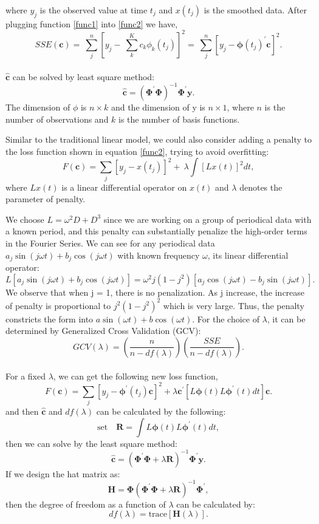 where $y_{j}$ is the observed value at time $t_{j}$ and $x(t_{j})$ is the smoothed data. After plugging function \ref{func1} into \ref{func2} we have,\\
$$SSE\left(\bm{c}\right)=\ \sum_{j}^{n}\left[y_j-\ \sum_{k}^{K}{c_k\phi_k\left(t_j\right)}\right]^2=\ \sum_{j}^{n}\left[y_j-\bm{\phi}\left(t_j\right)^\prime\bm{c}\right]^2.$$\\
$\bm \hat{c}$ can be solved by least square method:\\
$$\hat{\bm{c}}=\left(\bm{\Phi}^\prime\bm{\Phi}\right)^{-1}\bm{\Phi}^\prime\bm{y}.$$
The dimension of $\phi$ is $n \times k$ and the dimension of y is $n\times1$, where $n$ is the number of observations and $k$ is the number of basis functions.

Similar to the traditional linear model, we could also consider adding a penalty to the loss function shown in equation \ref{func2}, trying to avoid overfitting:
$$F\left(\bm{c}\right)=\sum_{j}\left[y_j-x\left(t_j\right)\right]^2+\ \lambda\int\left[Lx\left(t\right)\right]^2dt,$$
where $Lx(t)$ is a linear differential operator on $x(t)$ and $\lambda$ denotes the parameter of penalty.

We choose $L=\omega^2D+D^3$ since we are working on a group of periodical data with a known period, and this penalty can substantially penalize the high-order terms in the Fourier Series. We can see for any periodical data $a_{j}\sin(j\omega t)+b_{j}\cos(j\omega t)$ with known frequency $\omega$, its linear differential operator: 
$$L\left[a_j\sin{\left(j\omega t\right)}+b_j\cos{\left(j\omega t\right)}\right]=\omega^2j\left(1-j^2\right)\left[a_j\cos{\left(j\omega t\right)}-b_j\sin{\left(j\omega t\right)}\right].$$
We observe that when j = 1, there is no penalization. As j increase, the increase of penalty is proportional to $j^2 (1-j^2)^2$ which is very large. Thus, the penalty constricts the form into $a\sin(\omega t) + b\cos(\omega t)$.
\noindent
For the choice of $\lambda$, it can be determined by Generalized Cross Validation (GCV):\\
$$GCV\left(\lambda\right)=\left(\frac{n}{n-df\left(\lambda\right)}\right)\left(\frac{SSE}{n-df(\lambda)}\right).$$\\
For a fixed $\lambda$, we can get the following new loss function,\\
$$F\left(\bm{c}\right)=\sum_{j}\left[y_j-\bm{\bm\phi}^\prime\left(t_j\right)\bm{c}\right]^2+\lambda\bm{c}^\prime[L\bm{\phi}(t)L\bm\phi^{\prime}(t)dt]\bm c.$$
and then $\bm \hat{c}$ and $df(\lambda)$ can be calculated by the following:
$$\text{set}\quad \bm{R}=\int{L\bm{\phi}\left(t\right)L\bm{\phi}^\prime\left(t\right)dt},$$ 
then we can solve by the least square method: 
$$\hat{\bm{c}}=\left(\bm{\Phi}^\prime\bm{\Phi}+\lambda\bm{R}\right)^{-1}\bm{\Phi}^\prime\bm{y}.$$
If we design the hat matrix as:
$$\bm{H}=\bm{\Phi}\left(\bm{\Phi}^\prime\bm{\Phi}+\lambda\bm{R}\right)^{-1}\bm{\Phi}^\prime,$$
then the degree of freedom as a function of $\lambda$ can be calculated by: 
$$df\left(\lambda\right)=\mathrm{trace}\left[\bm{H}\left(\lambda\right)\right].$$

